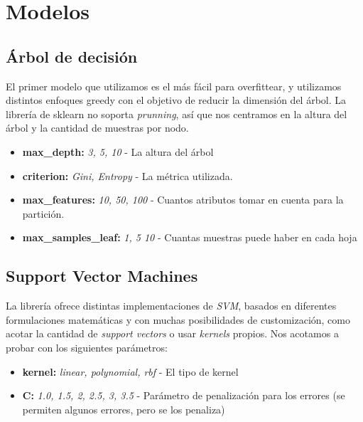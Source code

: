 \section{Modelos}

\subsection{Árbol de decisión}
El primer modelo que utilizamos es el más fácil para overfittear, y utilizamos distintos enfoques greedy con el objetivo de
reducir la dimensión del árbol. La librería de sklearn no soporta \textit{prunning}, así que nos centramos en la altura del árbol
y la cantidad de muestras por nodo.
\begin{itemize}
\item \textbf{max\_depth:} \textit{3, 5, 10} - La altura del árbol
\item \textbf{criterion:} \textit{Gini, Entropy} - La métrica utilizada.
\item \textbf{max\_features:} \textit{10, 50, 100} - Cuantos atributos tomar en cuenta para la partición.
\item \textbf{max\_samples\_leaf:} \textit{1, 5 10} - Cuantas muestras puede haber en cada hoja
\end{itemize}


\subsection{Support Vector Machines}
La librería ofrece distintas implementaciones de \textit{SVM}, basados en diferentes formulaciones matemáticas y
con muchas posibilidades de customización, como acotar la cantidad de \textit{support vectors} o usar \textit{kernels} propios.
Nos acotamos a probar con los siguientes parámetros:
\begin{itemize}
\item \textbf{kernel:} \textit{linear, polynomial, rbf} - El tipo de kernel
\item \textbf{C:} \textit{1.0, 1.5, 2, 2.5, 3, 3.5} - Parámetro de penalización para los errores (se permiten algunos errores, pero se los penaliza)
\end{itemize}


